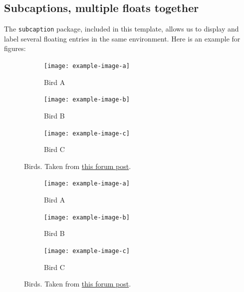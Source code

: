 \subsection{Subcaptions, multiple floats together} \label{sec:subcaption}

The \verb|subcaption| package, included in this template, allows us to display and label several floating entries in the same environment. Here is an example for figures:

\begin{figure}[h]
	\centering
	\begin{subfigure}{0.3\textwidth}
		\centering
		\texttt{[image: example-image-a]}
		\caption{Bird A}
		\label{fig:bird-a}
	\end{subfigure}
	\hfill %
	\begin{subfigure}{0.3\textwidth}
		\centering
		\texttt{[image: example-image-b]}
		\caption{Bird B}
		\label{fig:bird-a}
	\end{subfigure}
	\hfill
	\begin{subfigure}{0.3\textwidth}
		\centering
		\texttt{[image: example-image-c]}
		\caption{Bird C}
		\label{fig:bird-a}
	\end{subfigure}
	\caption{Birds. Taken from \href{https://tex.stackexchange.com/questions/343605/latex-code-for-subcaption-of-image}{this forum post}.}
	\label{fig:birds-1}
\end{figure}

\begin{TeXlstlisting}
\begin{figure}[h]
	\centering
	\begin{subfigure}{0.3\textwidth}
		\centering
		\texttt{[image: example-image-a]}
		\caption{Bird A}
		\label{fig:bird-a}
	\end{subfigure}
	\hfill %
	\begin{subfigure}{0.3\textwidth}
		\centering
		\texttt{[image: example-image-b]}
		\caption{Bird B}
		\label{fig:bird-a}
	\end{subfigure}
	\hfill
	\begin{subfigure}{0.3\textwidth}
		\centering
		\texttt{[image: example-image-c]}
		\caption{Bird C}
		\label{fig:bird-a}
	\end{subfigure}
	\caption{Birds. Taken from \href{https://tex.stackexchange.com/questions/343605/latex-code-for-subcaption-of-image}{this forum post}.}
	\label{fig:birds-1}
\end{figure}
\end{TeXlstlisting}

